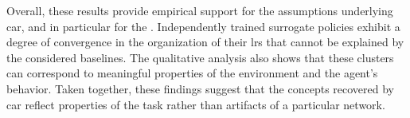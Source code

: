Overall, these results provide empirical support for the assumptions underlying \gls{car}, and in particular for the \RepresentationConvergenceHypothesisName.
Independently trained surrogate policies exhibit a degree of convergence in the organization of their \glspl{lr} that cannot be explained by the considered baselines.
The qualitative analysis also shows that these clusters can correspond to meaningful properties of the environment and the agent's behavior.
Taken together, these findings suggest that the concepts recovered by \gls{car} reflect properties of the task rather than artifacts of a particular network.

